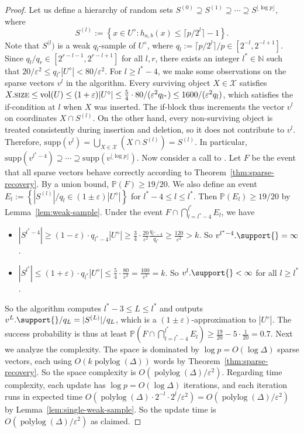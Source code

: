 \documentclass[11pt]{article}
\def\Natural{\mathbb{N}}
\let\N\Natural
\def\polylog{\operatorname{polylog}}
\def\vol{\operatorname{vol}}		%
\def\set#1{\left\{ #1 \right\}}
\def\card#1{\left\lvert #1 \right\rvert}		%
\newcommand{\size}{\textsc{size}}
\newcommand{\supp}{\mathrm{supp}}
\newcommand{\eps}{\varepsilon}
\renewcommand{\Pr}{\mathbb{P}}
\newcommand{\class}[1]{\mathcal{#1}}
\newcommand{\discrete}[1]{#1^\diamond}
\begin{document}
%
\begin{proof}
    Let us define a hierarchy of random sets $S^{(0)} \supseteq S^{(1)} \supseteq \cdots \supseteq S^{\lfloor \log p \rfloor}$, where
    \[ S^{(l)} := \set{ x \in \discrete{U} : h_{a,b}(x) \leq \lceil p/2^l \rceil - 1 }. \]
    Note that $S^{(l})$ is a weak $q_l$-sample of $\discrete{U}$, where $q_l := \lceil p/2^l \rceil / p \in [2^{-l}, 2^{-l+1}]$. Since $q_l/q_r \in [2^{r-l-1}, 2^{r-l+1}]$ for all $l,r$, there exists an integer $l^* \in \N$ such that $20/\eps^2 \leq q_{l^*} |\discrete{U}| < 80/\eps^2$.
%
    For $l \geq l^*-4$, we make some observations on the sparse vectors $v^l$ in the algorithm. Every surviving object $X \in \class{X}$ satisfies $X.\size \leq \vol(U) \leq (1+\eps) |\discrete{U}| \leq \frac{5}{4} \cdot 80 / (\eps^2 q_{l^*}) \leq 1600 / (\eps^2 q_l)$, which satisfies the if-condition at $l$ when $X$ was inserted. The if-block thus increments the vector $v^l$ on coordinates $X \cap S^{(l)}$. On the other hand, every non-surviving object is treated consistently during insertion and deletion, so it does not contribute to $v^l$. Therefore, $\supp(v^l) = \bigcup_{X \in \class{X}} (X \cap S^{(l)}) = S^{(l)}$. In particular, $\supp(v^{l^*-4}) \supseteq \cdots \supseteq \supp(v^{\lfloor \log p \rfloor})$.
%
    Now consider a call to \est{}. Let $F$ be the event that all sparse vectors behave correctly according to Theorem~\ref{thm:sparse-recovery}. By a union bound, $\Pr(F) \geq 19/20$. We also define an event $E_l := \set{|S^{(l)}|/q_l \in (1 \pm \eps) |\discrete{U}|}$ for $l^*-4 \leq l \leq l^*$. Then $\Pr(E_l) \geq 19/20$ by Lemma~\ref{lem:weak-sample}. Under the event $F \cap \bigcap_{l=l^*-4}^{l^*} E_l$, we have
    \begin{itemize}
        \item $\card{S^{l^*-4}} \geq (1-\eps) \cdot q_{l^*-4} |\discrete{U}| \geq \frac{3}{4} \cdot \frac{20}{\eps^2} \frac{q_{l^*-4}}{q_{l^*}} \geq \frac{120}{\eps^2} > k$. So $v^{l^*-4}.\support{} = \infty$.
        \item $\card{S^{l^*}} \leq (1+\eps) \cdot q_{l^*} |\discrete{U}| \leq \frac{5}{4} \cdot \frac{80}{\eps^2} = \frac{100}{\eps^2} = k$. So $v^l.\support{} < \infty$ for all $l \geq l^*$.
    \end{itemize}
    So the algorithm computes $l^* - 3 \leq L \leq l^*$ and outputs $v^L.\support{}/q_L = |S^{(L)}|/q_L$, which is a $(1 \pm \eps)$-approximation to $|\discrete{U}|$. The success probability is thus at least $\Pr( F \cap \bigcap_{l=l^*-4}^{l^*} E_l ) \geq \frac{19}{20} - 5 \cdot \frac{1}{20} = 0.7$.
%
    Next we analyze the complexity. The space is dominated by $\log p = O(\log \Delta)$ sparse vectors, each using $O(k\polylog(\Delta))$ words by Theorem~\ref{thm:sparse-recovery}. So the space complexity is $O(\polylog(\Delta)/\eps^2)$. Regarding time complexity, each update has $\log p = O(\log \Delta)$ iterations, and each iteration runs in expected time $O(\polylog(\Delta) \cdot 2^{-l} \cdot 2^l/\eps^2) = O(\polylog(\Delta) / \eps^2)$ by Lemma~\ref{lem:single-weak-sample}. So the update time is $O(\polylog(\Delta) / \eps^2)$ as claimed.
\end{proof}
\end{document}
